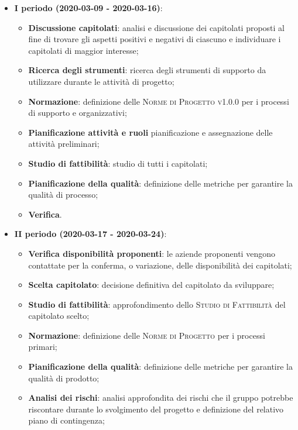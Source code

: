 \documentclass[../piano-di-progetto.tex]{subfiles}
\begin{document}
\begin{itemize}

    \item \textbf{I periodo (2020-03-09 - 2020-03-16)}:
        \begin{itemize}
            \item \textbf{Discussione capitolati}: analisi e discussione dei capitolati proposti al fine di trovare gli aspetti positivi e negativi di ciascuno e individuare i capitolati di maggior interesse;
            \item \textbf{Ricerca degli strumenti}: ricerca degli strumenti di supporto da utilizzare durante le attività di progetto;
            \item \textbf{Normazione}: definizione delle \textsc{Norme di Progetto v1.0.0} per i processi di supporto e organizzativi;
            \item \textbf{Pianificazione attività e ruoli} pianificazione e assegnazione delle attività preliminari;
            \item \textbf{Studio di fattibilità}: studio di tutti i capitolati;
            \item \textbf{Pianificazione della qualità}: definizione delle metriche per garantire la qualità di processo;
            \item \textbf{Verifica}.
        \end{itemize}
        \item \textbf{II periodo (2020-03-17 - 2020-03-24)}:
            \begin{itemize}
                \item \textbf{Verifica disponibilità proponenti}: le aziende proponenti vengono contattate per la conferma, o variazione, delle disponibilità dei capitolati;
                \item \textbf{Scelta capitolato}: decisione definitiva del capitolato da sviluppare;
                \item \textbf{Studio di fattibilità}: approfondimento dello \textsc{Studio di Fattibilità} del capitolato scelto;
                \item \textbf{Normazione}: definizione delle \textsc{Norme di Progetto} per i processi primari;
                \item \textbf{Pianificazione della qualità}: definizione delle metriche per garantire la qualità di prodotto;
                \item \textbf{Analisi dei rischi}: analisi approfondita dei rischi che il gruppo potrebbe riscontare durante lo svolgimento del progetto e definizione del relativo piano di contingenza;

\end{itemize}
\end{itemize}
\end{document}
